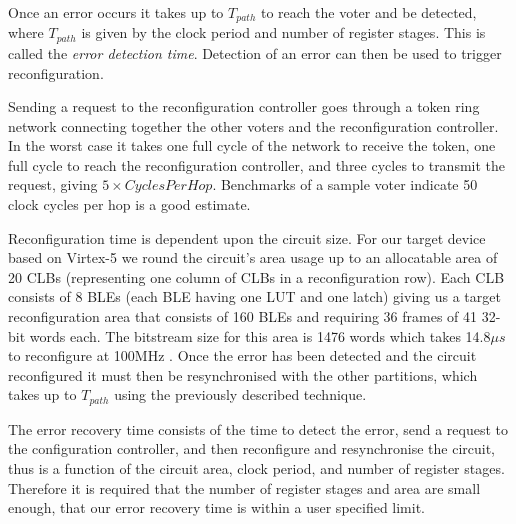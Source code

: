 \documentclass[12pt,final,oneside]{dwThesis} %
\begin{document}
   Once an error occurs it takes up to $T_{path}$ to reach the voter and be
   detected, where $T_{path}$ is given by the clock period and number of
   register stages. This is called the \textit{error detection time}. Detection
   of an error can then be used to trigger reconfiguration.

   Sending a request to the reconfiguration controller goes through a token
   ring network connecting together the other voters and the reconfiguration
   controller. In the worst case it takes one full cycle of the network to
   receive the token, one full cycle to reach the reconfiguration controller,
   and three cycles to transmit the request, giving $5\times Cycles Per Hop$.
   Benchmarks of a sample voter indicate 50 clock cycles per hop is a good
   estimate.

   Reconfiguration time is dependent upon the circuit size.
   For our target device based on Virtex-5 we round the circuit's area usage up
   to an allocatable area of 20 \glspl{CLB} (representing one column of \glspl{CLB} 
   in a reconfiguration row). Each \gls{CLB} consists of 8 \glspl{BLE} (each
   \gls{BLE} having one \gls{LUT} and one latch) giving us a target 
   reconfiguration area that consists of 160 \glspl{BLE} and requiring 36
   frames of 41 32-bit words each. The bitstream size for this area is 1476
   words which takes 14.8$\mu{}s$ to reconfigure at 100MHz
   \cite{XilinxConfigurationUG}.  Once the error has been detected and the
   circuit reconfigured it must then be resynchronised with the other
   partitions, which takes up to $T_{path}$ using the previously described
   technique.

   The error recovery time consists of the time to detect the error, send a
   request to the configuration controller, and then reconfigure and
   resynchronise the circuit, thus is a function of the circuit area, clock
   period, and number of register stages. Therefore it is required that the
   number of register stages and area are small enough,
   that our error recovery time is within a user specified limit.
\end{document}
